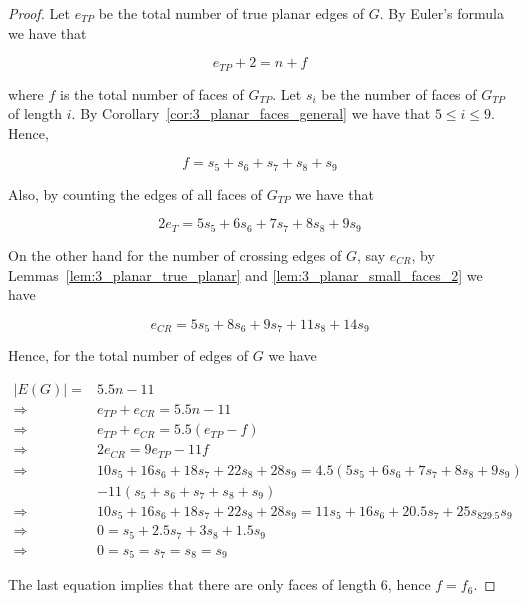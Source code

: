  \begin{proof}
  Let $e_{TP}$ be the total number of true planar edges of $G$. By Euler's formula we have that
  
  \begin{equation}
   e_{TP}+2=n+f
  \end{equation}
  
  where $f$ is the total number of faces of $G_{TP}$. Let $s_i$ be the number of faces of $G_{TP}$ of length $i$. By Corollary~\ref{cor:3_planar_faces_general} we have that $5\leq i\leq 9$. Hence,
  
  \begin{equation}
   f=s_5+s_6+s_7+s_8+s_9
  \end{equation}

  Also, by counting the edges of all faces of $G_{TP}$ we have that
  
  \begin{equation}
   2e_{T}=5s_5+6s_6+7s_7+8s_8+9s_9
  \end{equation}

  On the other hand for the number of crossing edges of $G$, say $e_{CR}$, by Lemmas~\ref{lem:3_planar_true_planar} and \ref{lem:3_planar_small_faces_2} we have
  
  \begin{equation}
   e_{CR}=5s_5+8s_6+9s_7+11s_8+14s_9
  \end{equation}

  Hence, for the total number of edges of $G$ we have 
  

  $\begin{array}{ll}
   |E(G)|= & 5.5n-11\\
    \Rightarrow &e_{TP}+e_{CR}= 5.5n-11\\
    \Rightarrow &e_{TP}+e_{CR}= 5.5(e_{TP}-f)\\
    \Rightarrow &2e_{CR}= 9e_{TP}-11f\\
    \Rightarrow &10s_5+16s_6+18s_7+22s_8+28s_9 = 4.5(5s_5+6s_6+7s_7+8s_8+9s_9)\\
   &-11(s_5+s_6+s_7+s_8+s_9)\\
    \Rightarrow &10s_5+16s_6+18s_7+22s_8+28s_9=11s_5+16s_6+20.5s_7+25s_829.5s_9\\
    \Rightarrow &0= s_5+2.5s_7+3s_8+1.5s_9\\
   \Rightarrow &0=s_5=s_7=s_8=s_9
  \end{array}$

The last equation implies that there are only faces of length $6$, hence $f=f_6$.
 \end{proof}

